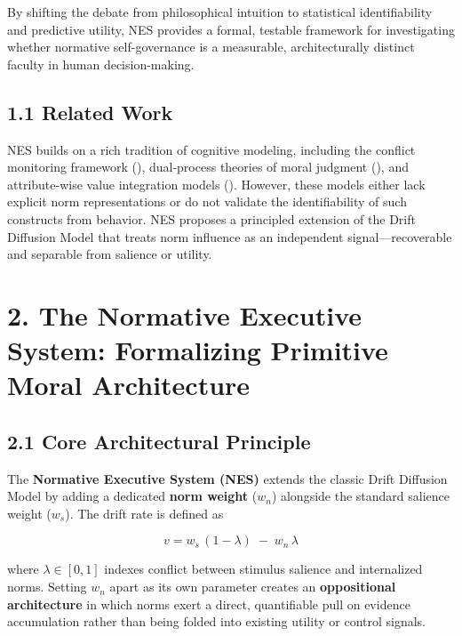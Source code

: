 \documentclass[
  11pt,
]{article}
\begin{document}
By shifting the debate from philosophical intuition to statistical
identifiability and predictive utility, NES provides a formal, testable
framework for investigating whether normative self-governance is a
measurable, architecturally distinct faculty in human decision-making.

\subsection{1.1 Related Work}\label{related-work}

NES builds on a rich tradition of cognitive modeling, including the
conflict monitoring framework
(), dual-process theories of moral judgment
(), and attribute-wise
value integration models (). However, these models either lack explicit norm
representations or do not validate the identifiability of such
constructs from behavior. NES proposes a principled extension of the
Drift Diffusion Model that treats norm influence as an independent
signal---recoverable and separable from salience or utility.

\section{2. The Normative Executive System: Formalizing Primitive Moral
Architecture}\label{the-normative-executive-system-formalizing-primitive-moral-architecture}

\subsection{2.1 Core Architectural
Principle}\label{core-architectural-principle}

The \textbf{Normative Executive System (NES)} extends the classic Drift
Diffusion Model by adding a dedicated \textbf{norm weight} (\(w_n\))
alongside the standard salience weight (\(w_s\)). The drift rate is
defined as

\[
v = w_s\,(1 - \lambda)\;-\;w_n\,\lambda
\]

where \(\lambda\in[0,1]\) indexes conflict between stimulus salience and
internalized norms. Setting \(w_n\) apart as its own parameter creates
an \textbf{oppositional architecture} in which norms exert a direct,
quantifiable pull on evidence accumulation rather than being folded into
existing utility or control signals.
\end{document}
